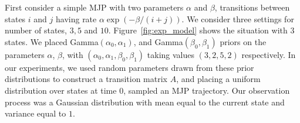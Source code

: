 \noindent First consider a simple MJP with two parameters $\alpha$ and $\beta$, transitions between states $i$ and $j$ having rate $\alpha \exp(-\beta/(i+j))$.
We consider three settings for number of states, $3, 5$ and $10$.
Figure~\ref{fig:exp_model} shows the situation with $3$ states.  
We placed Gamma$(\alpha_0,\alpha_1)$, and Gamma$(\beta_0, \beta_1)$ priors on the parameters $\alpha$, $\beta$, with $(\alpha_0,\alpha_1,\beta_0,\beta_1)$ taking
values $(3,2,5,2)$ respectively. In our experiments, we used random parameters drawn from these prior distributions to construct a transition matrix $A$,
and placing a uniform distribution over states at time $0$, sampled an MJP trajectory.
Our observation process was a Gaussian distribution with mean equal to the current state and variance equal to $1$.

